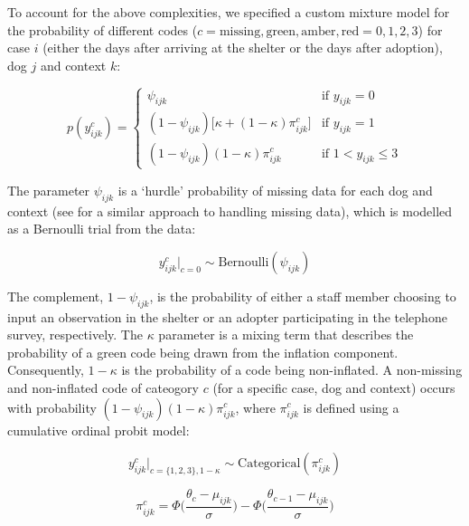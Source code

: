 \documentclass[12pt]{article}
\begin{document}
To account for the above complexities, we specified a custom mixture model for the probability of different codes ($c = {\text{missing}, \text{green}, \text{amber}, \text{red}} = {0, 1, 2, 3}$) for case $i$ (either the days after arriving at the shelter or the days after adoption), dog $j$ and context $k$:

\begin{equation}
  p(y_{ijk}^{c}) =
  \begin{cases}
      \psi_{ijk} & \text{if } y_{ijk} = 0 \\
      (1-\psi_{ijk})\big[\kappa + (1-\kappa)\pi_{ijk}^c\big]
      & \text{if } y_{ijk} = 1 \\
      (1-\psi_{ijk})(1-\kappa)\pi_{ijk}^c
      & \text{if } 1 < y_{ijk} \leq 3
  \end{cases}
  \label{eq_mixture}
\end{equation}

The parameter $\psi_{ijk}$ is a ‘hurdle’ probability of missing data for each dog and context (see \cite{kubinec2019} for a similar approach to handling missing data), which is modelled as a Bernoulli trial from the data:

\begin{equation}
  y_{ijk}^{c} \big|_{c=0} \sim \text{Bernoulli}(\psi_{ijk})
  \label{eq_missing}
\end{equation}

The complement, $1 - \psi_{ijk}$, is the probability of either a staff member choosing to input an observation in the shelter or an adopter participating in the telephone survey, respectively. The $\kappa$ parameter is a mixing term that describes the probability of a green code being drawn from the inflation component. Consequently,  $1 - \kappa$ is the probability of a code being non-inflated. A non-missing and non-inflated code of cateogory $c$ (for a specific case, dog and context) occurs with probability $(1-\psi_{ijk})(1-\kappa)\pi_{ijk}^c$, where $\pi_{ijk}^c$ is defined using a cumulative ordinal probit model:

\begin{equation}
  y_{ijk}^{c} \big|_{c=\{1,2,3\}, 1 - \kappa} \sim \text{Categorical}(\pi_{ijk}^c)
  \label{eq_cat}
\end{equation}

\begin{equation}
  \pi_{ijk}^c = \Phi \Big( \frac{\theta_{c} - \mu_{ijk}}{\sigma} \Big) - \Phi \Big( \frac{\theta_{c-1} - \mu_{ijk}}{\sigma} \Big)
  \label{eq_ordprob}
\end{equation}
\end{document}
